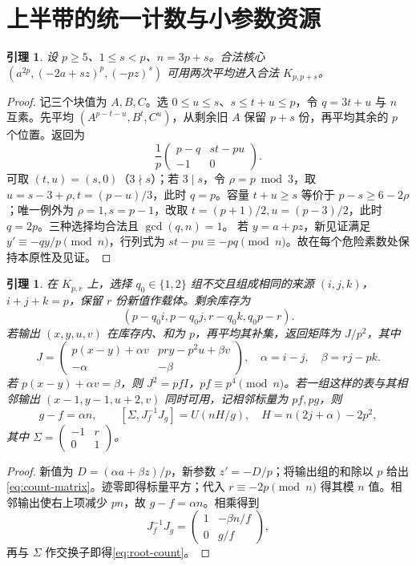 \documentclass[11pt,a4paper]{article}
\newtheorem{lemma}[theorem]{引理}
\theoremstyle{definition}
\numberwithin{equation}{section}
\begin{document}
\section{上半带的统一计数与小参数资源}
\begin{lemma}\label{lem:shape-change}
设 $p\ge5$、$1\le s<p$、$n=3p+s$。合法核心 $(a^{2p},(-2a+sz)^p,(-pz)^s)$ 可用两次平均进入合法 $K_{p,p+s}$。
\end{lemma}
\begin{proof}
记三个块值为 $A,B,C$。选 $0\le u\le s$、$s\le t+u\le p$，令 $q=3t+u$ 与 $n$ 互素。先平均 $(A^{p-t-u},B^t,C^u)$，从剩余旧 $A$ 保留 $p+s$ 份，再平均其余的 $p$ 个位置。返回为
\[
\frac1p\begin{pmatrix}p-q&st-pu\\-1&0\end{pmatrix}.
\]
可取 $(t,u)=(s,0)$（$3\nmid s$）；若 $3\mid s$，令 $\rho=p\bmod3$，取 $u=s-3+\rho,t=(p-u)/3$，此时 $q=p$。容量 $t+u\ge s$ 等价于 $p-s\ge6-2\rho$；唯一例外为 $\rho=1,s=p-1$，改取 $t=(p+1)/2,u=(p-3)/2$，此时 $q=2p$。三种选择均合法且 $\gcd(q,n)=1$。
若 $y=a+pz$，新见证满足 $y'\equiv-qy/p\pmod n$，行列式为 $st-pu\equiv-pq\pmod n$。故在每个危险素数处保持本原性及见证。
\end{proof}

\begin{lemma}\label{lem:count-interface}
在 $K_{p,r}$ 上，选择 $q_0\in\{1,2\}$ 组不交且组成相同的来源 $(i,j,k)$，$i+j+k=p$，保留 $r$ 份新值作载体。剩余库存为
\begin{equation}\label{eq:stock}
(p-q_0i,p-q_0j,r-q_0k,q_0p-r).
\end{equation}
若输出 $(x,y,u,v)$ 在库存内、和为 $p$，再平均其补集，返回矩阵为 $J/p^2$，其中
\begin{equation}\label{eq:count-matrix}
J=\begin{pmatrix}p(x-y)+\alpha v&pry-p^2u+\beta v\\-\alpha&-\beta\end{pmatrix},
\quad \alpha=i-j,\quad\beta=rj-pk.
\end{equation}
若 $p(x-y)+\alpha v=\beta$，则 $J^2=pfI$，$pf\equiv p^4\pmod n$。若一组这样的表与其相邻输出 $(x-1,y-1,u+2,v)$ 同时可用，记相邻标量为 $pf,pg$，则
\begin{equation}\label{eq:root-count}
g-f=\alpha n,\qquad
[\Sigma,J_f^{-1}J_g]=U(nH/g),\quad H=n(2j+\alpha)-2p^2,
\end{equation}
其中 $\Sigma=\left(\begin{smallmatrix}-1&r\\0&1\end{smallmatrix}\right)$。
\end{lemma}
\begin{proof}
新值为 $D=(\alpha a+\beta z)/p$，新参数 $z'=-D/p$；将输出组的和除以 $p$ 给出\eqref{eq:count-matrix}。迹零即得标量平方；代入 $r\equiv-2p\pmod n$ 得其模 $n$ 值。相邻输出使右上项减少 $pn$，故 $g-f=\alpha n$。相乘得到
\[
J_f^{-1}J_g=\begin{pmatrix}1&-\beta n/f\\0&g/f\end{pmatrix},
\]
再与 $\Sigma$ 作交换子即得\eqref{eq:root-count}。
\end{proof}
\end{document}
